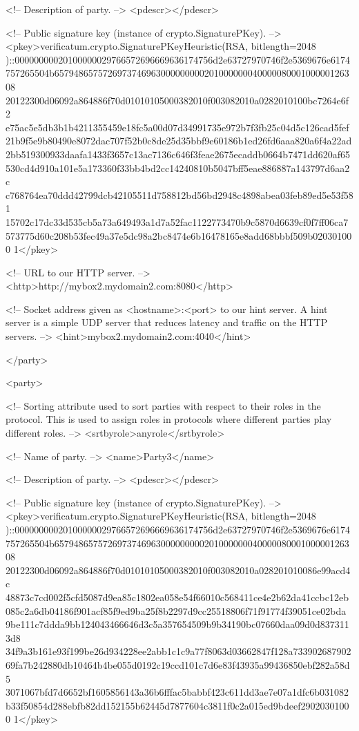       <!-- Description of party. -->
      <pdescr></pdescr>

      <!-- Public signature key (instance of crypto.SignaturePKey). -->
      <pkey>verificatum.crypto.SignaturePKeyHeuristic(RSA, bitlength=2048
)::00000000020100000029766572696669636174756d2e63727970746f2e5369676e6174
757265504b657948657572697374696300000000020100000004000008000100000126308
20122300d06092a864886f70d01010105000382010f003082010a0282010100bc7264e6f2
e75ac5e5db3b1b4211355459e18fc5a00d07d34991735e972b7f3fb25c04d5c126cad5fef
21b9f5e9b80490e8072dac707f52b0c8de25d35bbf9e60186b1ed26fd6aaa820a6f4a22ad
2bb519300933daafa1433f3657c13ac7136c646f3feae2675ecaddb0664b7471dd620af65
530cd4d910a101e5a173360f33bb4bd2cc14240810b5047bff5eae886887a143797d6aa2c
c768764ea70ddd42799dcb42105511d758812bd56bd2948c4898abea03feb89ed5e53f581
15702c17dc33d535cb5a73a649493a1d7a52fac1122773470b9c5870d6639cf0f7ff06ca7
573775d60c208b53fec49a37e5dc98a2bc8474e6b16478165e8add68bbbf509b020301000
1</pkey>

      <!-- URL to our HTTP server. -->
      <http>http://mybox2.mydomain2.com:8080</http>

      <!-- Socket address given as <hostname>:<port> to our hint server. 
           A hint server is a simple UDP server that reduces latency and 
           traffic on the HTTP servers. -->
      <hint>mybox2.mydomain2.com:4040</hint>

   </party>

   <party>

      <!-- Sorting attribute used to sort parties with respect to their 
           roles in the protocol. This is used to assign roles in 
           protocols where different parties play different roles. -->
      <srtbyrole>anyrole</srtbyrole>

      <!-- Name of party. -->
      <name>Party3</name>

      <!-- Description of party. -->
      <pdescr></pdescr>

      <!-- Public signature key (instance of crypto.SignaturePKey). -->
      <pkey>verificatum.crypto.SignaturePKeyHeuristic(RSA, bitlength=2048
)::00000000020100000029766572696669636174756d2e63727970746f2e5369676e6174
757265504b657948657572697374696300000000020100000004000008000100000126308
20122300d06092a864886f70d01010105000382010f003082010a028201010086e99acd4c
48873c7cd002f5cfd5087d9ea85c1802ea058e54f66010c568411ce4e2b62da41ccbc12eb
085c2a6db04186f901acf85f9ed9ba25f8b2297d9cc25518806f71f91774f39051ce02bda
9be111c7ddda9bb124043466646d3c5a357654509b9b34190bc07660daa09d0d8373113d8
34f9a3b161e93f199be26d934228ee2abb1c1c9a77f8063d03662847f128a733902687902
69fa7b242880db10464b4be055d0192c19ccd101c7d6e83f43935a99436850ebf282a58d5
3071067bfd7d6652bf1605856143a36b6fffac5babbf423c611dd3ae7e07a1dfc6b031082
b33f50854d288ebfb82dd152155b62445d7877604c3811f0c2a015ed9bdeef29020301000
1</pkey>

